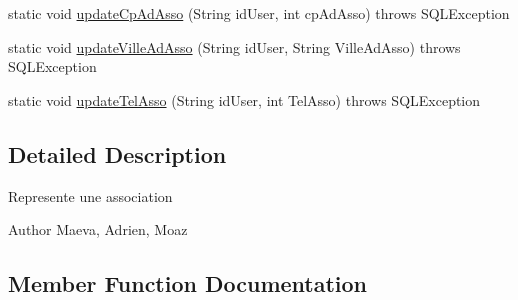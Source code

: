 \begin{DoxyCompactItemize}
\item 
static void \hyperlink{classcom_1_1ecetech_1_1bti4_1_1itproject_1_1classified_1_1dao_1_1_association_d_a_o_a7c9c96fcfb5e950d61f79df851f9575b}{update\+Cp\+Ad\+Asso} (String id\+User, int cp\+Ad\+Asso)  throws S\+Q\+L\+Exception 
\item 
static void \hyperlink{classcom_1_1ecetech_1_1bti4_1_1itproject_1_1classified_1_1dao_1_1_association_d_a_o_a65048bf95fdcd35ee35d5c0bee623b8b}{update\+Ville\+Ad\+Asso} (String id\+User, String Ville\+Ad\+Asso)  throws S\+Q\+L\+Exception 
\item 
static void \hyperlink{classcom_1_1ecetech_1_1bti4_1_1itproject_1_1classified_1_1dao_1_1_association_d_a_o_a4714a27c39d0537a449cc3f47cf9e737}{update\+Tel\+Asso} (String id\+User, int Tel\+Asso)  throws S\+Q\+L\+Exception 
\end{DoxyCompactItemize}


\subsection{Detailed Description}
Represente une association \begin{DoxyAuthor}{Author}
Maeva, Adrien, Moaz 
\end{DoxyAuthor}


\subsection{Member Function Documentation}
